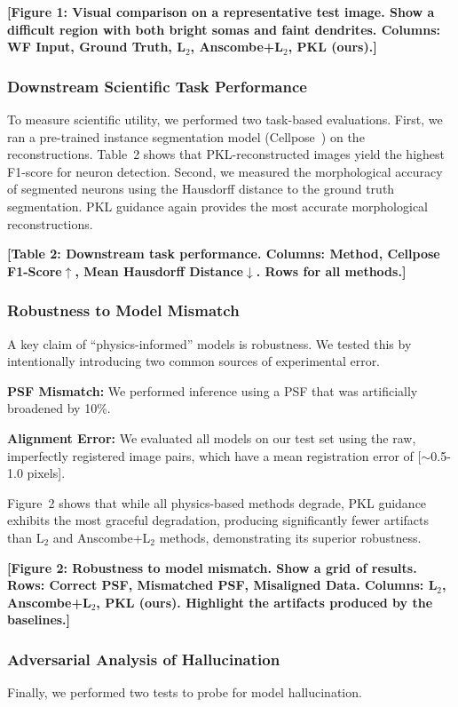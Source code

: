 \documentclass{article}
\begin{document}
\textbf{[Figure 1: Visual comparison on a representative test image. Show a difficult region with both bright somas and faint dendrites. Columns: WF Input, Ground Truth, L$_2$, Anscombe+L$_2$, PKL (ours).]}

\subsubsection{Downstream Scientific Task Performance}
To measure scientific utility, we performed two task-based evaluations. First, we ran a pre-trained instance segmentation model (Cellpose~\cite{stringer2021cellpose}) on the reconstructions. Table~2 shows that PKL-reconstructed images yield the highest F1-score for neuron detection. Second, we measured the morphological accuracy of segmented neurons using the Hausdorff distance to the ground truth segmentation. PKL guidance again provides the most accurate morphological reconstructions.

\textbf{[Table 2: Downstream task performance. Columns: Method, Cellpose F1-Score$\uparrow$, Mean Hausdorff Distance$\downarrow$. Rows for all methods.]}

\subsubsection{Robustness to Model Mismatch}
A key claim of ``physics-informed'' models is robustness. We tested this by intentionally introducing two common sources of experimental error.

\textbf{PSF Mismatch:} We performed inference using a PSF that was artificially broadened by 10\%.

\textbf{Alignment Error:} We evaluated all models on our test set using the raw, imperfectly registered image pairs, which have a mean registration error of [$\sim$0.5-1.0 pixels].

Figure~2 shows that while all physics-based methods degrade, PKL guidance exhibits the most graceful degradation, producing significantly fewer artifacts than L$_2$ and Anscombe+L$_2$ methods, demonstrating its superior robustness.

\textbf{[Figure 2: Robustness to model mismatch. Show a grid of results. Rows: Correct PSF, Mismatched PSF, Misaligned Data. Columns: L$_2$, Anscombe+L$_2$, PKL (ours). Highlight the artifacts produced by the baselines.]}

\subsubsection{Adversarial Analysis of Hallucination}
Finally, we performed two tests to probe for model hallucination.
\end{document}
